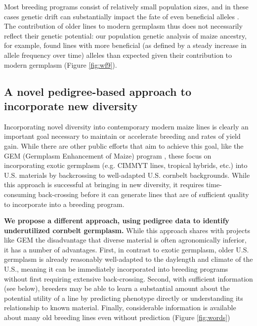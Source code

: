 \documentclass[12pt]{article}
\begin{document}
Most breeding programs consist of relatively small population sizes, and in these cases genetic drift can substantially impact the fate of even beneficial alleles \citep[e.g.][]{Gerke:2013tw}.
The contribution of older lines to modern germplasm thus does not necessarily reflect their genetic potential: our population genetic analysis of maize ancestry, for example, found lines with more beneficial (as defined by a steady increase in allele frequency over time) alleles than expected given their contribution to modern germplasm (Figure \ref{fig:wf9}).

\subsection*{A novel pedigree-based approach to incorporate new diversity}

Incorporating novel diversity into contemporary modern maize lines is clearly an important goal necessary to maintain or accelerate breeding and rates of yield gain.
While there are other public efforts that aim to achieve this goal, like the GEM  (Germplasm Enhancement of Maize) program \citep{pollak2003history}, these  focus on incorporating exotic germplasm (e.g. CIMMYT lines, tropical hybrids, etc.) into U.S. materials by backcrossing to well-adapted U.S. cornbelt backgrounds.
While this approach is successful at bringing in new diversity, it requires time-consuming back-crossing before it can generate lines that are of sufficient quality to incorporate into a breeding program.

\textbf{We propose a different approach, using pedigree data to identify underutilized cornbelt germplasm.}  
While this approach shares with projects like GEM the disadvantage that diverse material is often  agronomically inferior, it has a number of advantages.  
First, in contrast to exotic germplasm, older U.S. germplasm is already reasonably well-adapted to the daylength and climate of the U.S., meaning it can be immediately incorporated into breeding programs without first requiring extensive back-crossing.
Second, with sufficient information (see below), breeders may be able to learn a substantial amount about the potential utility of a line by predicting phenotype directly or understanding its relationship to known material. 
Finally, considerable information is available about many old breeding lines even without prediction (Figure \ref{fig:words})
\end{document}
